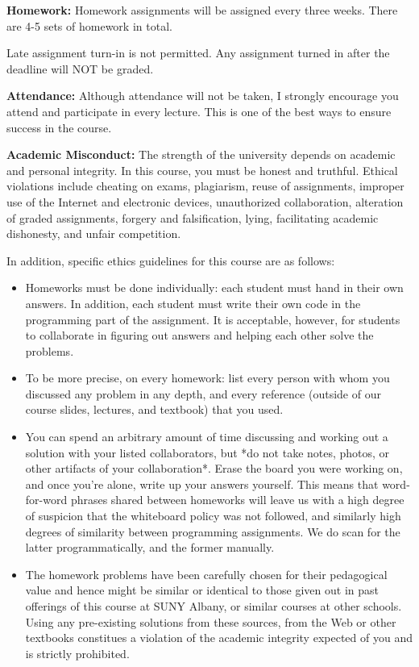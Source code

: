 \documentclass[a4paper,10pt]{article}
\begin{document}
\textbf{Homework:} Homework assignments will be assigned every three weeks. There are 4-5 sets of homework in total. 

Late assignment turn-in is not permitted. Any assignment turned in after the deadline will NOT be graded.




\textbf{Attendance:} Although attendance will not be taken, I strongly encourage you attend and participate in every lecture. This is one of the best ways to ensure success in the course.






\textbf{Academic Misconduct:} The strength of the university depends on academic and personal integrity. In this course, you must be honest 
and truthful. Ethical violations include cheating on exams, plagiarism, reuse of assignments, improper use 
of the Internet and electronic devices, unauthorized collaboration, alteration of graded assignments, forgery 
and falsification, lying, facilitating academic dishonesty, and unfair competition.

In addition, specific ethics guidelines for this course are as follows: 
\begin{itemize}
\item Homeworks must be done individually: each student must hand in their own answers. In addition, each student must write their own code in the programming part of the assignment. It is acceptable, however, for students to collaborate in figuring out answers and helping each other solve the problems.

\item To be more precise, on every homework:
list every person with whom you discussed any problem in any depth, and every reference (outside of our course slides, lectures, and textbook) that you used.

\item You can spend an arbitrary amount of time discussing and working out a solution with your listed collaborators, but *do not take notes, photos, or other artifacts of your collaboration*. Erase the board you were working on, and once you're alone, write up your answers yourself.
This means that word-for-word phrases shared between homeworks will leave us with a high degree of suspicion that the whiteboard policy was not followed, and similarly high degrees of similarity between programming assignments. We do scan for the latter programmatically, and the former manually.

\item The homework problems have been carefully chosen for their pedagogical value and hence might be similar or identical to those given out in past offerings of this course at SUNY Albany, or similar courses at other schools. Using any pre-existing solutions from these sources, from the Web or other textbooks constitues a violation of the academic integrity expected of you and is strictly prohibited.
\end{itemize}
\end{document}

